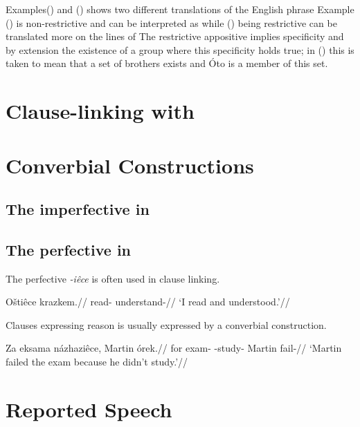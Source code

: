 Examples() and () shows two different translations of the English phrase  Example () is non-restrictive and can be interpreted as  while () being restrictive can be translated more on the lines of  The restrictive appositive implies specificity and by extension the existence of a group where this specificity holds true; in () this is taken to mean that a set of brothers exists and \'Oto is a member of this set.

\section{Clause-linking with }

\section{Converbial Constructions}\label{converbs-syntax}

\subsection{The imperfective in }



\subsection{The perfective in }

The perfective \textit{-iêce} is often used in clause linking.

\pex
\begingl
\gla O\v{s}tiêce krazkem.//
\glb read- understand-//
\glft `I read and understood.'//
\endgl
\xe

Clauses expressing reason is usually expressed by a converbial construction.

\pex
\begingl
\gla Za eksama názhaziêce, Martin órek.//
\glb for exam- -study- Martin fail-//
\glft `Martin failed the exam because he didn't study.'//
\endgl
\xe

\section{Reported Speech}\label{sec:reportedspeech}

